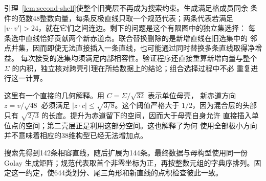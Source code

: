 引理~\ref{lem:second-shell}使整个旧壳层不再成为搜索约束。生成满足格成员同余
条件的范数48整数向量，每条反极直线只取一个规范代表；两条代表若满足
$|v\cdot v'|>24$，就在它们之间连边。剩下的问题是这个有限图中的独立集选择：
每条选中直线恰好贡献两个新赤道点。联合替换删除的是新增直线在旧选集中的
邻点并集，因而即使无法直接插入一条直线，也可能通过同时替换多条直线取得净增益。
每次接受的选集均须满足内部相容性。验证程序还直接重算新增向量与整个
$\Sigma$ 的内积，独立核对跨壳引理在所给数据上的结论；组合选择过程中不必
重复进行这一计算。

这里有一个直接的几何解释。用 $C=\Sigma/\sqrt{32}$ 表示单位母壳，
新赤道方向 $z=v/\sqrt{48}$ 必须满足
$|z\cdot c|\le\sqrt{3/8}$。这个阈值严格大于 $1/2$，因为混合层的头部
只有 $\sqrt{2/3}$ 的长度。提升为赤道留下的空间，因而大于母壳自身允许
直接插入单位点的空间；第二壳层正是利用这部分空间。这也解释了为何
使用全部极小方向并不意味着相应的38维构型已经无法增加点。

搜索先得到142条相容直线，随后扩展为144条。最终数据与母构型使用同一份
Golay
生成矩阵；规范代表取首个非零坐标为正，再按整数元组的字典序排列。固定这一约定，使644类划分、尾三角形和新直线的点积检查彼此一致。

